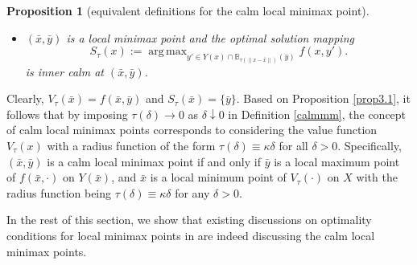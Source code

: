 \documentclass[11pt]{article}
\DeclareMathOperator*{\argmax}{arg\,max}
\numberwithin{equation}{section}
\newtheorem{proposition}{Proposition}[section]
\begin{document}
{\begin{proposition}[equivalent definitions for the calm local minimax point]
\begin{itemize}
\item[(iv)] $(\bar x,\bar y)$ is a local minimax point and the optimal solution mapping
\begin{equation}\label{localizedS}
S_{\tau}(x):=\argmax_{y' \in Y(x) \cap \mathbb{B}_{\tau(\|x-\bar x\|)}(\bar y)} f(x,y').
\end{equation}
is inner calm at $(\bar{x}, \bar{y})$.
\end{itemize}
\end{proposition}

Clearly, $V_{\tau}(\bar{x}) = f(\bar{x}, \bar{y})$ and $S_{\tau}(\bar{x}) = \{\bar{y}\}$. Based on Proposition \ref{prop3.1}, it follows that by imposing $\tau(\delta) \to 0$ as $\delta \downarrow 0$ in Definition \ref{calmmm}, the concept of calm local minimax points corresponds to considering the value function $V_{\tau}(x)$ with a radius function of the form $\tau(\delta) \equiv \kappa \delta$ for all $\delta > 0$. Specifically, $\left(\bar x, \bar y\right)$ is a calm local minimax point if and only if $\bar y$ is a local maximum point of $f\left(\bar x , \cdot\right)$  on $ Y(\bar x)$, and $\bar x$ is a local minimum point of $V_{\tau}(\cdot)$ on $X$ with the radius function being $\tau(\delta) \equiv \kappa\delta$ for any $\delta>0$. 

In the rest of this section, we show that existing discussions on optimality conditions for local minimax points in { \cite{DaiZh-2020}} are indeed discussing the calm local minimax points.

}
\end{document}
